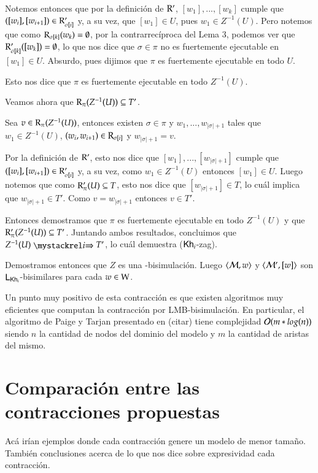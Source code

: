 \begin{demostracion}
\begin{itemize}
        Notemos entonces que por la definición de $\mathrm{R}'$, $[w_1],...,[w_k]$ cumple que $([w_i],[w_{i+1}]) \in \mathrm{R}'_{\sigma[i]}$ y, a su vez, que $[w_1] \in U$, pues $w_1 \in Z^{-1}(U)$. Pero notemos que como $\mathrm{R}_{\sigma[k]}(w_k) = \emptyset$, por la contrarrecíproca del Lema 3, podemos ver que $\mathrm{R}'_{\sigma[k]}([w_k]) = \emptyset$, lo que nos dice que $\sigma \in \pi$ no es fuertemente ejecutable en $[w_1] \in U$. Absurdo, pues dijimos que $\pi$ es fuertemente ejecutable en todo $U$.

        Esto nos dice que $\pi$ es fuertemente ejecutable en todo $Z^{-1}(U)$.

        Veamos ahora que $\mathrm{R}_\pi(Z^{-1}(U)) \subseteq T'$.

        Sea $v \in \mathrm{R}_\pi(Z^{-1}(U))$, entonces existen $\sigma \in \pi$ y $w_1,...,w_{|\sigma|+1}$ tales que $w_1 \in Z^{-1}(U)$, $(w_i,w_{i+1}) \in \mathrm{R}_{\sigma[i]}$ y $w_{|\sigma|+1} = v$. 

        Por la definición de $\mathrm{R}'$, esto nos dice que $[w_1],...,[w_{|\sigma|+1}]$ cumple que $([w_i],[w_{i+1}]) \in \mathrm{R}'_{\sigma[i]}$ y, a su vez, como $w_1 \in Z^{-1}(U)$ entonces $[w_1] \in U$. Luego notemos que como $\mathrm{R}'_\pi(U) \subseteq T$, esto nos dice que $[w_{|\sigma|+1}] \in T$, lo cuál implica que $w_{|\sigma|+1} \in T'$. Como $v = w_{|\sigma|+1}$ entonces $v \in T'$. 

        Entonces demostramos que $\pi$ es fuertemente ejecutable en todo $Z^{-1}(U)$ y que $\mathrm{R}'_\pi(Z^{-1}(U)) \subseteq T'$. Juntando ambos resultados, concluimos que $Z^{-1}(U) \ultsExecAgi T'$, lo cuál demuestra ($\mathsf{Kh}_i$-zag).
    \end{itemize}
    Demostramos entonces que $Z$ es una \KHilogic-bisimulación. Luego $\langle \mathcal{M},w \rangle$ y $\langle \mathcal{M}',[w] \rangle$ son $\mathsf{L}_{\mathsf{Kh}_i}$-bisimilares para cada $w \in \mathrm{W}$.
\end{demostracion}

Un punto muy positivo de esta contracción es que existen algoritmos muy eficientes que computan la contracción por LMB-bisimulación. En particular, 
el algoritmo de Paige y Tarjan presentado en (citar) tiene complejidad $\mathcal{O}(m*log(n))$ siendo $n$ la cantidad de nodos del dominio del modelo y 
$m$ la cantidad de aristas del mismo.


\section{Comparación entre las contracciones propuestas}


Acá irían ejemplos donde cada contracción genere un modelo de menor tamaño. También conclusiones acerca de lo que nos dice sobre expresividad cada
contracción.